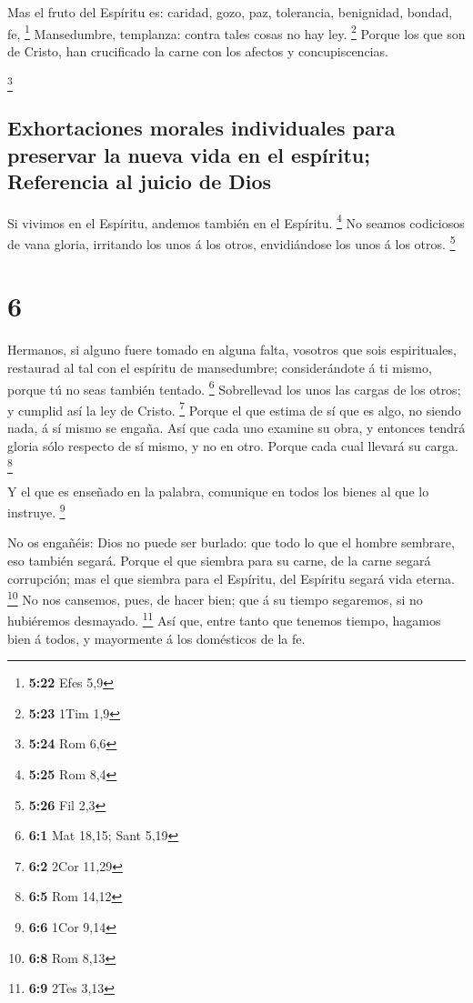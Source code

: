  Mas el fruto del Espíritu es: caridad, gozo, paz,
tolerancia, benignidad, bondad, fe, \footnote{\textbf{5:22} Efes 5,9}
 Mansedumbre, templanza: contra tales cosas no hay ley.
\footnote{\textbf{5:23} 1Tim 1,9}  Porque los que son de
Cristo, han crucificado la carne con los afectos y concupiscencias.

\footnote{\textbf{5:24} Rom 6,6}

\hypertarget{exhortaciones-morales-individuales-para-preservar-la-nueva-vida-en-el-espuxedritu-referencia-al-juicio-de-dios}{%
\subsection{Exhortaciones morales individuales para preservar la nueva
vida en el espíritu; Referencia al juicio de
Dios}\label{exhortaciones-morales-individuales-para-preservar-la-nueva-vida-en-el-espuxedritu-referencia-al-juicio-de-dios}}

 Si vivimos en el Espíritu, andemos también en el Espíritu.
\footnote{\textbf{5:25} Rom 8,4}  No seamos codiciosos de
vana gloria, irritando los unos á los otros, envidiándose los unos á los
otros. \footnote{\textbf{5:26} Fil 2,3}

\hypertarget{section-5}{%
\section{6}\label{section-5}}

 Hermanos, si alguno fuere tomado en alguna falta, vosotros
que sois espirituales, restaurad al tal con el espíritu de mansedumbre;
considerándote á ti mismo, porque tú no seas también tentado.
\footnote{\textbf{6:1} Mat 18,15; Sant 5,19}  Sobrellevad
los unos las cargas de los otros; y cumplid así la ley de Cristo.
\footnote{\textbf{6:2} 2Cor 11,29}  Porque el que estima de
sí que es algo, no siendo nada, á sí mismo se engaña.  Así
que cada uno examine su obra, y entonces tendrá gloria sólo respecto de
sí mismo, y no en otro.  Porque cada cual llevará su carga.
\footnote{\textbf{6:5} Rom 14,12}

 Y el que es enseñado en la palabra, comunique en todos los
bienes al que lo instruye. \footnote{\textbf{6:6} 1Cor 9,14}

 No os engañéis: Dios no puede ser burlado: que todo lo que
el hombre sembrare, eso también segará.  Porque el que
siembra para su carne, de la carne segará corrupción; mas el que siembra
para el Espíritu, del Espíritu segará vida eterna. \footnote{\textbf{6:8}
  Rom 8,13}  No nos cansemos, pues, de hacer bien; que á su
tiempo segaremos, si no hubiéremos desmayado. \footnote{\textbf{6:9}
  2Tes 3,13}  Así que, entre tanto que tenemos tiempo,
hagamos bien á todos, y mayormente á los domésticos de la fe.

